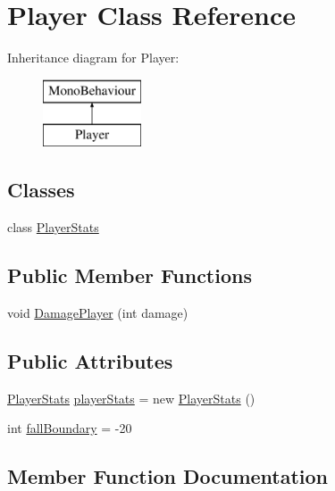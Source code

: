 \hypertarget{class_player}{}\section{Player Class Reference}
\label{class_player}
Inheritance diagram for Player\+:\begin{figure}[H]
\begin{center}
\leavevmode
\includegraphics[height=2.000000cm]{class_player}
\end{center}
\end{figure}
\subsection*{Classes}
\begin{DoxyCompactItemize}
\item 
class \hyperlink{class_player_1_1_player_stats}{Player\+Stats}
\end{DoxyCompactItemize}
\subsection*{Public Member Functions}
\begin{DoxyCompactItemize}
\item 
void \hyperlink{class_player_aa379444243743f421fd9780fecb17697}{Damage\+Player} (int damage)
\end{DoxyCompactItemize}
\subsection*{Public Attributes}
\begin{DoxyCompactItemize}
\item 
\hyperlink{class_player_1_1_player_stats}{Player\+Stats} \hyperlink{class_player_ad8cc72394939af31e95be0fc9c86e38d}{player\+Stats} = new \hyperlink{class_player_1_1_player_stats}{Player\+Stats} ()
\item 
int \hyperlink{class_player_acab571d7ec4e78a57d16d68cc7b62693}{fall\+Boundary} = -\/20
\end{DoxyCompactItemize}


\subsection{Member Function Documentation}
\hypertarget{class_player_aa379444243743f421fd9780fecb17697}{}
